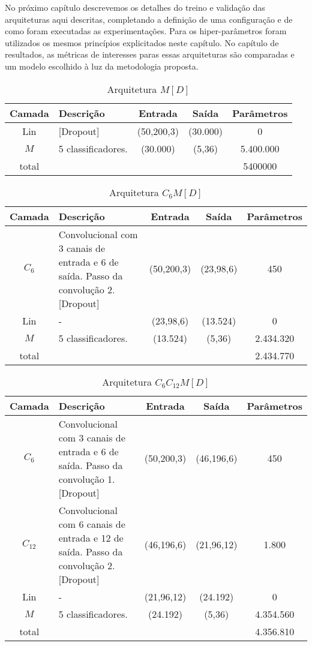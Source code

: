 No próximo capítulo descrevemos os detalhes do treino e validação das arquiteturas aqui descritas, completando a definição de uma configuração e de como foram executadas as experimentações. Para os hiper-parâmetros foram utilizados os mesmos princípios explicitados neste capítulo. No capítulo de resultados, as métricas de interesses paras essas arquiteturas são comparadas e um modelo escolhido à luz da metodologia proposta.

\noindent
\begin{table}[!p]
\begin{center}
	\caption{Arquitetura $M[D]$}
	\label{tab_md}
\end{center}
\begin{tabularx}{\linewidth}{ |c|X|c|c|c| }
	\hline
	Camada & Descrição & Entrada & Saída & Parâmetros \\ \hline\hline
	Lin & [Dropout] & (50,200,3) & (30.000) & 0 \\ \hline
	$M$ & 5 classificadores. & (30.000) & (5,36) & 5.400.000 \\ \hline
	total &  &  &  & 5400000 \\ \hline
\end{tabularx}
\end{table}
\noindent
\begin{table}[!p]
	\begin{center}
		\caption{Arquitetura $C_6M[D]$}
	\end{center}
\begin{tabularx}{\linewidth}{ |c|X|c|c|c| }
	\hline
	Camada & Descrição & Entrada & Saída & Parâmetros \\ \hline \hline
	$C_{6}$ & Convolucional com 3 canais de entrada e 6 de saída. Passo da convolução 2.  [Dropout] & (50,200,3) & (23,98,6) & 450 \\ \hline
	Lin & - & (23,98,6) & (13.524) & 0 \\ \hline
	$M$ & 5 classificadores. & (13.524) & (5,36) & 2.434.320 \\ \hline
	total &  &  &  & 2.434.770 \\ \hline
\end{tabularx}
\end{table}
\noindent
\begin{table}[!p]
\begin{center}
	\caption{Arquitetura $C_6C_{12}M[D]$}
\end{center}
\begin{tabularx}{\linewidth}{ |c|X|c|c|c| }
	\hline
	Camada & Descrição & Entrada & Saída & Parâmetros \\ \hline \hline
	$C_{6}$ & Convolucional com 3 canais de entrada e 6 de saída. Passo da convolução 1. [Dropout]& (50,200,3) & (46,196,6) & 450 \\ \hline
	$C_{12}$ & Convolucional com 6 canais de entrada e 12 de saída. Passo da convolução 2.  [Dropout] & (46,196,6) & (21,96,12) & 1.800 \\ \hline
	Lin & - & (21,96,12) & (24.192) & 0 \\ \hline
	$M$ & 5 classificadores. & (24.192) & (5,36) & 4.354.560 \\ \hline
	total &  &  &  & 4.356.810 \\ \hline
\end{tabularx}
\end{table}
